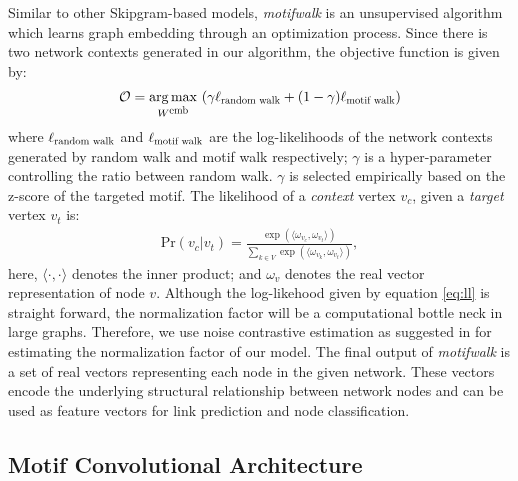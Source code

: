 \documentclass{article}
\DeclareMathOperator*{\argmax}{arg\,max}
\theoremstyle{definition}
\begin{document}
Similar to other Skipgram-based models, \emph{motifwalk} is an unsupervised
algorithm which learns graph embedding through an optimization process. 
Since there is two network contexts generated in our algorithm, the 
objective function is given by:
\begin{equation} 
\begin{aligned}
&\mathcal{O} = \argmax_{W^{\scalebox{0.75}{emb}}}\ (\gamma 
\ell_{\scalebox{0.75}{random walk}} + (1-\gamma) \ell_{\scalebox{0.75}
{motif walk}}) \\
\end{aligned}
\label{eq:mloss}
\end{equation}
where $\ell_{\scalebox{0.75}{random walk}}$ and $\ell_{\scalebox{0.75}
{motif walk}}$
are the log-likelihoods of the network contexts generated by
random walk and motif walk respectively; $\gamma$ is a hyper-parameter
controlling the ratio between random walk. $\gamma$ is selected 
empirically based on the z-score of the targeted motif. The likelihood
of a \emph{context} vertex $v_c$, given a \emph{target} vertex $v_t$ is:
\begin{equation} \label{eq:ll}
\begin{aligned}
    \mbox{Pr} (v_c | v_t) = \frac{\exp{( \langle \omega_{v_c} ,  \omega_{v_t} \rangle )}}{\sum_{k \in V} \exp{( \langle \omega_{v_k} ,  \omega_{v_t} \rangle )}},
\end{aligned}
\end{equation}
here, $\langle \cdot , \cdot \rangle$ denotes the inner product; and $\omega_v$ denotes
the real vector representation of node $v$. Although the log-likehood given
by equation \ref{eq:ll} is straight forward, the normalization factor will be
a computational bottle neck in large graphs. Therefore, we use noise contrastive
estimation as suggested in \cite{skipgram,node2vec} for estimating the 
normalization
factor of our model. The final output of \emph{motifwalk} is a set of real 
vectors representing each node in the given network. These vectors encode 
the underlying
structural relationship between network nodes and can be used as feature vectors
for link prediction and node classification.

\subsection{Motif Convolutional Architecture}
\end{document}
